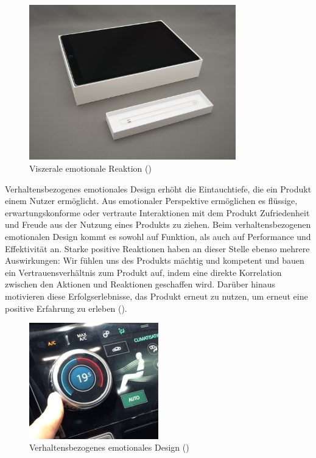 \documentclass[./dokumentation.tex]{subfiles}
\begin{document}
\begin{figure}[H]
    \centering
    \includegraphics[width=0.8\textwidth]{bilder/ipadbox.jpg}
    \caption{Viszerale emotionale Reaktion (\cite*{ipadbox})}
    \label{fig1:visc}
\end{figure}


Verhaltensbezogenes emotionales Design erhöht die Eintauchtiefe, die ein Produkt einem Nutzer ermöglicht. Aus emotionaler Perspektive ermöglichen es flüssige, erwartungskonforme oder vertraute Interaktionen mit dem Produkt Zufriedenheit und Freude aus der Nutzung eines Produkts zu ziehen. Beim verhaltensbezogenen emotionalen Design kommt es sowohl auf Funktion, als auch auf Performance und Effektivität an.
Starke positive Reaktionen haben an dieser Stelle ebenso mehrere Auswirkungen: Wir fühlen uns des Produkts mächtig und kompetent und bauen ein Vertrauensverhältnis zum Produkt auf, indem eine direkte Korrelation zwischen den Aktionen und Reaktionen geschaffen wird. Darüber hinaus motivieren diese Erfolgserlebnisse, das Produkt erneut zu nutzen, um erneut eine positive Erfahrung zu erleben (\cite{medium_muz}).\pagebreak


\begin{figure}[H]
    \centering
    \includegraphics[width=0.5\textwidth]{bilder/verh-bez-des.png}
    \caption{Verhaltensbezogenes emotionales Design (\cite{medium_muz})}
    \label{fig2:verh}
\end{figure}\\
\end{document}
